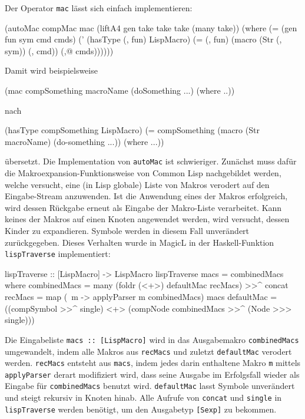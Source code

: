 \documentclass[12pt, a4paper, bibgerm]{scrbook}
\newenvironment{DIFnomarkup}{}{}
\newcommand\icode[1]{\lstinline?#1?}
\begin{document}
Der Operator \icode{mac} lässt sich einfach implementieren:
\begin{DIFnomarkup}\begin{code}
(autoMac compMac mac
  (liftA4 gen take take take (many take))
  (where (= (gen fun sym cmd cmds)
            (' (hasType (, fun) LispMacro)
               (= (, fun) (macro (Str (, sym)) (, cmd)) (,@ cmds))))))  
\end{code}\end{DIFnomarkup}
Damit wird beispielsweise 
\begin{DIFnomarkup}\begin{code}
(mac compSomething macroName 
    (doSomething ...) 
  (where ..))
\end{code}\end{DIFnomarkup}
nach
\begin{DIFnomarkup}\begin{code}
(hasType compSomething LispMacro)
(= compSomething (macro (Str macroName)
                   (do-something ...))
  (where ...))
\end{code}\end{DIFnomarkup}
übersetzt. Die Implementation von \icode{autoMac} ist
schwieriger. Zunächst muss dafür die Makroexpansion-Funktionsweise von
Common Lisp nachgebildet werden, welche versucht, eine (in Lisp
globale) Liste von Makros verodert auf den Eingabe-Stream anzuwenden. Ist
die Anwendung eines der Makros erfolgreich, wird dessen Rückgabe erneut
als Eingabe der Makro-Liste verarbeitet. Kann keines der Makros auf einen
Knoten angewendet werden, wird versucht, dessen Kinder zu
expandieren. Symbole werden in diesem Fall unverändert
zurückgegeben. Dieses Verhalten wurde in MagicL in der Haskell-Funktion
\icode{lispTraverse} implementiert:
\begin{DIFnomarkup}\begin{code}
lispTraverse :: [LispMacro] -> LispMacro
lispTraverse macs = combinedMacs
  where combinedMacs = many (foldr (<+>) defaultMac recMacs) >>^ concat
        recMacs      = map (\ m -> applyParser m combinedMacs) macs
        defaultMac   = ((compSymbol >>^ single) <+> 
                        (compNode combinedMacs >>^ (Node >>> single)))  
\end{code}\end{DIFnomarkup}
Die Eingabeliste \icode{macs :: [LispMacro]} wird in das Ausgabemakro
\icode{combinedMacs} umgewandelt, indem alle Makros aus \icode{recMacs}
und zuletzt \icode{defaultMac} verodert werden. \icode{recMacs} entsteht
aus \icode{macs}, indem jedes darin enthaltene Makro \icode{m} mittels
\icode{applyParser} derart modifiziert wird, dass seine Ausgabe im
Erfolgsfall wieder als Eingabe für \icode{combinedMacs} benutzt
wird. \icode{defaultMac} lasst Symbole unverändert und steigt rekursiv
in Knoten hinab. Alle Aufrufe von \icode{concat} und \icode{single} in
\icode{lispTraverse} werden benötigt, um den Ausgabetyp \icode{[Sexp]}
zu bekommen.
\end{document}

